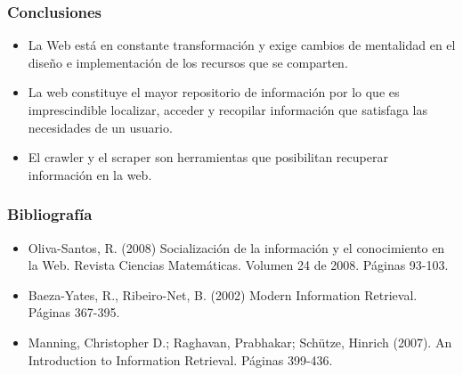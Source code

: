 \documentclass[
10pt, %
aspectratio=169, %
]{beamer}
\begin{document}
	\begin{frame}
		
		\frametitle{Conclusiones}
		
		\begin{itemize}
			
			\item La Web está en constante transformación y exige cambios de mentalidad en el diseño e implementación de los recursos que se comparten.
			
			\item La web constituye el mayor repositorio de información por lo que es imprescindible localizar, acceder y recopilar información que satisfaga las necesidades de un usuario. \\[2mm]
			
			\item El crawler y el scraper son herramientas que posibilitan recuperar información en la web. \\[2mm]
			
		\end{itemize}
		
	\end{frame}

	\begin{frame}
		
		\frametitle{Bibliografía}
		
		\begin{itemize}
			
			\item Oliva-Santos, R. (2008) Socialización de la información y el conocimiento en la Web. Revista Ciencias Matemáticas. Volumen 24 de 2008. Páginas 93-103.
			
			\item Baeza-Yates, R., Ribeiro-Net, B. (2002)
			Modern Information Retrieval. Páginas 367-395.
			
			\item Manning, Christopher D.;  Raghavan, Prabhakar; Schütze, Hinrich (2007). An Introduction to Information Retrieval. Páginas 399-436.
			
		\end{itemize}
		
	\end{frame}
	
	\begin{frame}
		\titlepage
	\end{frame}
	
	
	
\end{document}
